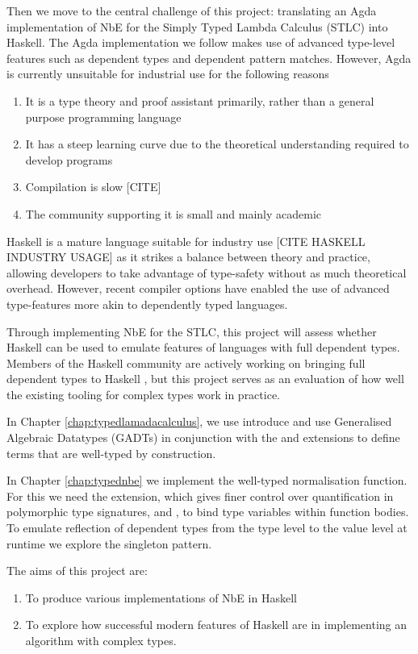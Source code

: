 Then we move to the central challenge of this project: translating an Agda implementation of NbE for the Simply Typed Lambda Calculus (STLC) into Haskell. The Agda implementation we follow makes use of advanced type-level features such as dependent types and dependent pattern matches. However, Agda is currently unsuitable for industrial use for the following reasons

\begin{enumerate}
    \item It is a type theory and proof assistant primarily, rather than a general purpose programming language
    \item It has a steep learning curve due to the theoretical understanding required to develop programs
    \item Compilation is slow [CITE]
    \item The community supporting it is small and mainly academic
\end{enumerate}

Haskell is a mature language suitable for industry use [CITE HASKELL INDUSTRY USAGE] as it strikes a balance between theory and practice, allowing developers to take advantage of type-safety without as much theoretical overhead. However, recent compiler options have enabled the use of advanced type-features more akin to dependently typed languages. 

Through implementing NbE for the STLC, this project will assess whether Haskell can be used to emulate features of languages with full dependent types. Members of the Haskell community are actively working on bringing full dependent types to Haskell \cite{DH}, but this project serves as an evaluation of how well the existing tooling for complex types work in practice.

In Chapter \ref{chap:typedlamadacalculus}, we use introduce and use Generalised Algebraic Datatypes (GADTs) in conjunction with the  and  extensions to define terms that are well-typed by construction. 

In Chapter \ref{chap:typednbe} we implement the well-typed normalisation function. For this we need the  extension, which gives finer control over quantification in polymorphic type signatures, and , to bind type variables within function bodies. To emulate reflection of dependent types from the type level to the value level at runtime we explore the singleton pattern.

The aims of this project are:
\begin{enumerate}
    \item To produce various implementations of NbE in Haskell
    \item To explore how successful modern features of Haskell are in implementing an algorithm with complex types.
\end{enumerate}